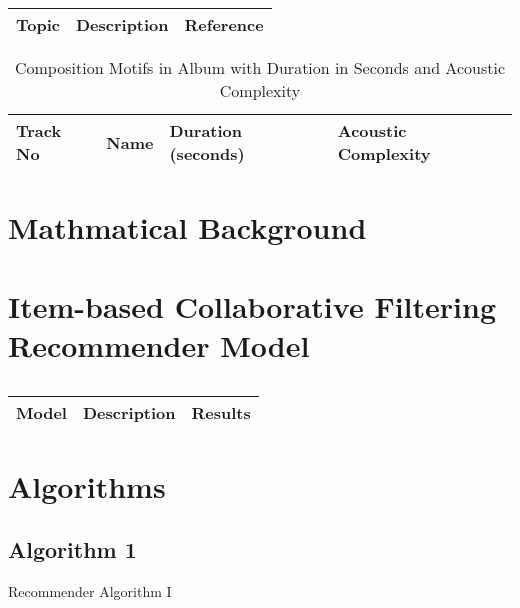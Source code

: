 \centering	
\begin{table}[H]\tiny
	\caption{}	
	\begin{tabular}{r|p{4cm}|l}
		\hline	
		Topic & Description & Reference \\
		\hline 
		\hline 
	\end{tabular}
\end{table}

\begin{table}[H]
	\caption{Composition Motifs in Album with Duration in Seconds and Acoustic Complexity}	
	\begin{tabular}{p{1cm}p{4cm}p{2cm}p{2cm}}
	\hline
	Track No & Name & Duration (seconds) & Acoustic Complexity\\
	\hline
	\hline 
	\end{tabular}
\end{table}

\section{Mathmatical Background}

\section{Item-based Collaborative Filtering Recommender Model}

\centering	
\begin{table}[H]\tiny
	\caption{}	
	\begin{tabular}{r|p{4cm}|l}
		\hline	
		Model & Description & Results \\
		\hline 
		\hline 
	\end{tabular}
\end{table}

\section{Algorithms}

\subsection{Algorithm 1}

\begin{algorithm}[H]
\begin{algorithmic}[1]

\end{algorithmic}
	\caption{Recommender Algorithm I}
	\label{Recommender_1}
\end{algorithm}

